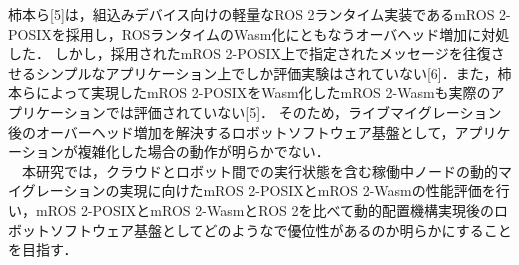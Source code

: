 柿本ら[5]は，組込みデバイス向けの軽量なROS 2ランタイム実装であるmROS 2-POSIXを採用し，ROSランタイムのWasm化にともなうオーバヘッド増加に対処した．
しかし，採用されたmROS 2-POSIX上で指定されたメッセージを往復させるシンプルなアプリケーション上でしか評価実験はされていない[6]．また，柿本らによって実現したmROS 2-POSIXをWasm化したmROS 2-Wasmも実際のアプリケーションでは評価されていない[5]．
そのため，ライブマイグレーション後のオーバーヘッド増加を解決するロボットソフトウェア基盤として，アプリケーションが複雑化した場合の動作が明らかでない．
\\　本研究では，クラウドとロボット間での実行状態を含む稼働中ノードの動的マイグレーションの実現に向けたmROS 2-POSIXとmROS 2-Wasmの性能評価を行い，mROS 2-POSIXとmROS 2-WasmとROS 2を比べて動的配置機構実現後のロボットソフトウェア基盤としてどのようなで優位性があるのか明らかにすることを目指す．